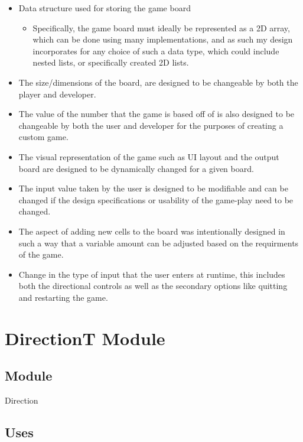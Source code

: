 \documentclass[12pt]{article}
\begin{document}
\begin{itemize}
  \item Data structure used for storing the game board
  \begin{itemize}
      \item Specifically, the game board must ideally be represented as a 2D array, which can be done using many implementations, and as such my design incorporates for any choice of such a data type, which could include nested lists, or specifically created 2D lists.
  \end{itemize}
  \item The size/dimensions of the board, are designed to be changeable by both the player and developer.
  \item The value of the number that the game is based off of is also designed to be changeable by both the user and developer for the purposes of creating a custom game.
  \item The visual representation of the game such as UI layout and the output board are designed to be dynamically changed for a given board.
  \item The input value taken by the user is designed to be modifiable and can be changed if the design specifications or usability of the game-play need to be changed.
  \item The aspect of adding new cells to the board was intentionally designed in such a way that a variable amount can be adjusted based on the requirments of the game.
  \item Change in the type of input that the user enters at runtime, this includes both the directional controls as well as the secondary options like quitting and restarting the game.
  \end{itemize}

\newpage

\section* {DirectionT Module}

\subsection*{Module}

Direction

\subsection* {Uses}
\end{document}
